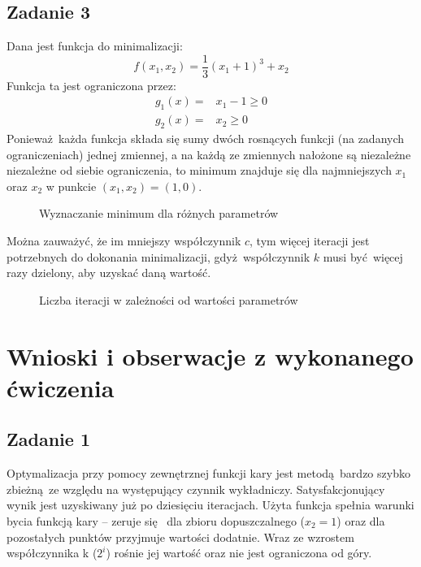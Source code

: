\documentclass[a4paper, 12pt]{article}
\begin{document}
        \subsection{Zadanie 3}
            Dana jest funkcja do minimalizacji:
            $$
                f(x_1, x_2) = \frac{1}{3} (x_1 + 1) ^3 + x_2
            $$
            Funkcja ta jest ograniczona przez:
            $$
                \begin{aligned}
                    g_1(x) =& x_1 - 1 \geq 0 \\
                    g_2(x) =& x_2 \geq 0 
                \end{aligned}
            $$
            Ponieważ każda funkcja składa się sumy dwóch rosnących funkcji (na zadanych ograniczeniach)
            jednej zmiennej, a na każdą ze zmiennych nałożone są niezależne niezależne od siebie 
            ograniczenia, to minimum znajduje się dla najmniejszych $x_1$ oraz $x_2$ w punkcie 
            $(x_1, x_2) = (1, 0)$. 
            \begin{figure}[H]
                \centering
                \def \svgwidth{0.7\columnwidth}
                
                \caption{Wyznaczanie minimum dla różnych parametrów}
            \end{figure}\noindent
            Można zauważyć, że im mniejszy współczynnik $c$, tym więcej iteracji jest potrzebnych do
            dokonania minimalizacji, gdyż współczynnik $k$ musi być więcej razy dzielony, aby uzyskać
            daną wartość.
            \begin{figure}[H]
                \centering
                \def \svgwidth{0.7\columnwidth}
                
                \caption{Liczba iteracji w zależności od wartości parametrów}
            \end{figure}\noindent
    \section{Wnioski i obserwacje z wykonanego ćwiczenia}
        \subsection{Zadanie 1}
            Optymalizacja przy pomocy zewnętrznej funkcji kary jest metodą bardzo szybko zbieżną ze
            względu na występujący czynnik wykładniczy. Satysfakcjonujący wynik jest uzyskiwany już
            po dziesięciu iteracjach. Użyta funkcja spełnia warunki bycia funkcją kary -- zeruje się 
            dla zbioru dopuszczalnego ($x_2 = 1$) oraz dla pozostałych punktów przyjmuje wartości
            dodatnie. Wraz ze wzrostem współczynnika k ($2^i$) rośnie jej wartość oraz nie jest
            ograniczona od góry.
\end{document}
